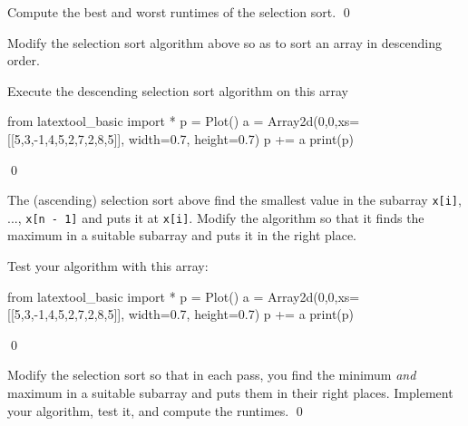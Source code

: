 \newpage
\begin{ex}
Compute the best and worst runtimes of the selection sort.
\qed
\end{ex}


\newpage
\begin{ex}
\begin{tightlist}
\item Modify the selection sort algorithm above so as to sort 
an array in descending order.
\item Execute the descending selection sort algorithm on this array

\begin{python}
from latextool_basic import *
p = Plot()
a = Array2d(0,0,xs=[[5,3,-1,4,5,2,7,2,8,5]], width=0.7, height=0.7)
p += a
print(p)
\end{python}
\end{tightlist}
\qed
\end{ex}


\newpage
\begin{ex}
\begin{tightlist}
\item The (ascending) selection sort above find the smallest value in 
the subarray \verb!x[i]!, ..., \verb!x[n - 1]! and puts it 
at \verb!x[i]!.
Modify the algorithm so that it finds the maximum in a suitable subarray
and puts it in the right place.
\item 
Test your algorithm with this array:
\begin{python}
from latextool_basic import *
p = Plot()
a = Array2d(0,0,xs=[[5,3,-1,4,5,2,7,2,8,5]], width=0.7, height=0.7)
p += a
print(p)
\end{python}
\end{tightlist}
\qed
\end{ex}

\newpage
\begin{ex}
Modify the selection sort so that in each
pass, you find the minimum \textit{and} maximum in a suitable subarray
and puts them in their right places.
Implement your algorithm, test it, and compute the 
runtimes.
\qed
\end{ex}

